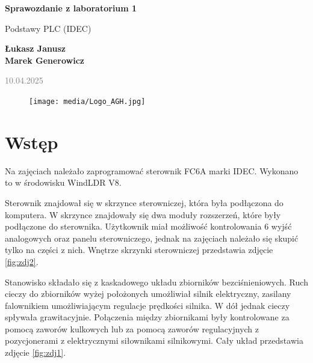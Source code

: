 \documentclass{article}
\begin{document}
\begin{titlepage}
    \begin{center}
        \vspace*{1cm}
            
        \Huge
        \textbf{Sprawozdanie z laboratorium 1}
            
        \vspace{0.5cm}
        \LARGE
        Podstawy PLC (IDEC)
            
        \vspace{1.5cm}
            
        \textbf{Łukasz Janusz\\Marek Generowicz}

        \normalsize      
        \textcolor{gray}{10.04.2025}
        \vfill
        \begin{figure}[hb]
            \centering
            \texttt{[image: media/Logo\_AGH.jpg]}
        \end{figure}   
    \end{center}
\end{titlepage}

\newpage
\section{Wstęp}
Na zajęciach należało zaprogramować sterownik FC6A marki IDEC. Wykonano to w środowisku WindLDR V8.

Sterownik znajdował się w skrzynce sterowniczej, która była podłączona do komputera. W skrzynce znajdowały się dwa moduły rozszerzeń, które były podłączone do sterownika. Użytkownik miał możliwość kontrolowania 6 wyjść analogowych oraz panelu sterowniczego, jednak na zajęciach należało się skupić tylko na części z nich. Wnętrze skrzynki sterowniczej przedstawia zdjęcie \ref{fig:zdj2}.

Stanowisko składało się z kaskadowego układu zbiorników bezciśnieniowych. Ruch cieczy do zbiorników wyżej położonych umożliwiał silnik elektryczny, zasilany falownikiem umożliwiającym regulacje prędkości silnika. W dół jednak cieczy spływała grawitacyjnie. Połączenia między zbiornikami były kontrolowane za pomocą zaworów kulkowych lub za pomocą zaworów regulacyjnych z pozycjonerami z elektrycznymi siłownikami silnikowymi. Cały układ przedstawia zdjęcie \ref{fig:zdj1}. 
\end{document}

